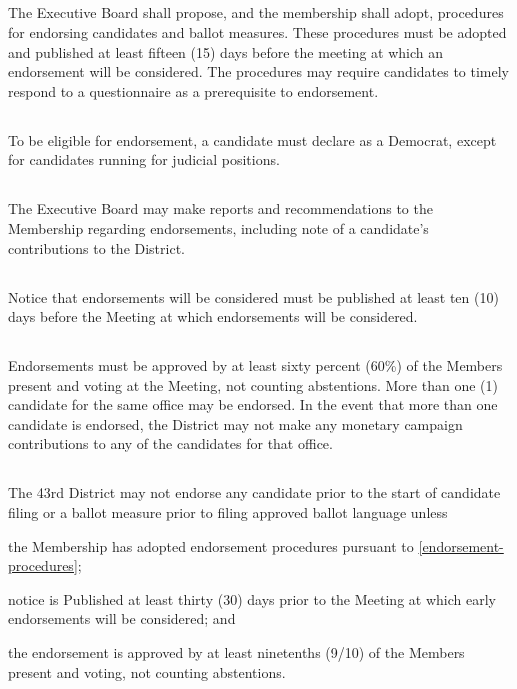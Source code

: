 \subsection{} \label{endorsement-procedures}
The Executive Board shall propose, and the membership shall adopt, procedures for endorsing candidates and ballot measures. These procedures must be adopted and published at least fifteen (15) days before the meeting at which an endorsement will be considered. The procedures may require candidates to timely respond to a questionnaire as a prerequisite to endorsement.

\subsection{}
To be eligible for endorsement, a candidate must declare as a Democrat, except for candidates running for judicial positions.

\subsection{}
The Executive Board may make reports and recommendations to the Membership regarding endorsements, including note of a candidate’s contributions to the \fortythird{} District.

\subsection{}
Notice that endorsements will be considered must be published at least ten (10) days before the Meeting at which endorsements will be considered.

\subsection{}
Endorsements must be approved by at least sixty percent (60\%) of the Members present and voting at the Meeting, not counting abstentions. More than one (1) candidate for the same office may be endorsed. In the event that more than one candidate is endorsed, the \fortythird{} District may not make any monetary campaign contributions to any of the candidates for that office.

\subsection{}
The 43rd District may not endorse any candidate prior to the start of candidate filing or a ballot measure prior to filing approved ballot language unless
\begin{inlinealphalist}
    \item the Membership has adopted endorsement procedures pursuant to \autoref{endorsement-procedures};
    \item notice is Published at least thirty (30) days prior to the Meeting at which early endorsements will be considered; and
    \item the endorsement is approved by at least ninetenths (9/10) of the Members present and voting, not counting abstentions.
\end{inlinealphalist}

